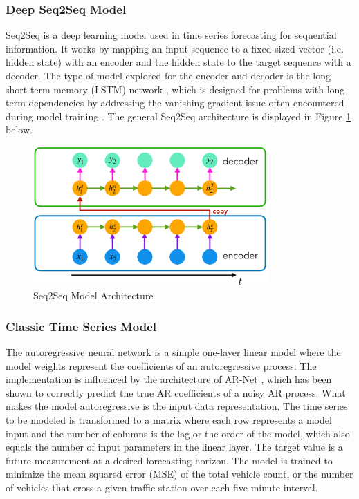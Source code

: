 \documentclass{article}
\begin{document}
\subsubsection{Deep Seq2Seq Model}

Seq2Seq is a deep learning model used in time series forecasting for sequential information. It works by mapping an input sequence to a fixed-sized vector (i.e. hidden state) with an encoder and the hidden state to the target sequence with a decoder. The type of model explored for the encoder and decoder is the long short-term memory (LSTM) network \cite{hochreiter1997lstm}, which is designed for problems with long-term dependencies by addressing the vanishing gradient issue often encountered during model training \cite{huang2020aortic}. The general Seq2Seq architecture is displayed in Figure \ref{fig:seq2seq-architecture} below.

\begin{figure}[hbt!]
	\centering
	\includegraphics[width=0.8\textwidth]{images/seq2seq_architecture.png}
	\caption{Seq2Seq Model Architecture \cite{yu2021sequence}}
	\label{fig:seq2seq-architecture}
\end{figure}

\subsubsection{Classic Time Series Model}

The autoregressive neural network is a simple one-layer linear model where the model weights represent the coefficients of an autoregressive process. The implementation is influenced by the architecture of AR-Net \cite{triebe2019arnet}, which has been shown to correctly predict the true AR coefficients of a noisy AR process. What makes the model autoregressive is the input data representation. The time series to be modeled is transformed to a matrix where each row represents a model input and the number of columns is the lag or the order of the model, which also equals the number of input parameters in the linear layer. The target value is a future measurement at a desired forecasting horizon. The model is trained to minimize the mean squared error (MSE) of the total vehicle count, or the number of vehicles that cross a given traffic station over each five minute interval.
\end{document}
